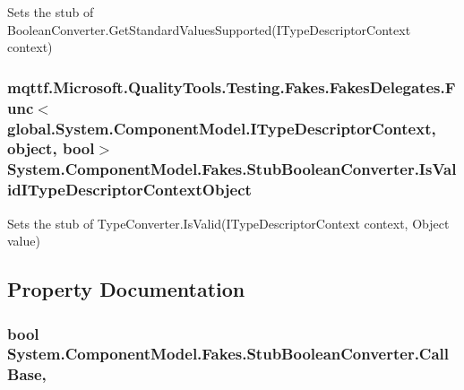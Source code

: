 Sets the stub of Boolean\-Converter.\-Get\-Standard\-Values\-Supported(\-I\-Type\-Descriptor\-Context context)

\hypertarget{class_system_1_1_component_model_1_1_fakes_1_1_stub_boolean_converter_abb8ccc319f6c9c06777e8aace8077986}{
\subsubsection[{Is\-Valid\-I\-Type\-Descriptor\-Context\-Object}]{\setlength{\rightskip}{0pt plus 5cm}mqttf.\-Microsoft.\-Quality\-Tools.\-Testing.\-Fakes.\-Fakes\-Delegates.\-Func$<$global.\-System.\-Component\-Model.\-I\-Type\-Descriptor\-Context, object, bool$>$ System.\-Component\-Model.\-Fakes.\-Stub\-Boolean\-Converter.\-Is\-Valid\-I\-Type\-Descriptor\-Context\-Object}}\label{class_system_1_1_component_model_1_1_fakes_1_1_stub_boolean_converter_abb8ccc319f6c9c06777e8aace8077986}


Sets the stub of Type\-Converter.\-Is\-Valid(\-I\-Type\-Descriptor\-Context context, Object value)



\subsection{Property Documentation}
\hypertarget{class_system_1_1_component_model_1_1_fakes_1_1_stub_boolean_converter_a40e24043ab02a1d6fbdba953f12c9279}{
\subsubsection[{Call\-Base}]{\setlength{\rightskip}{0pt plus 5cm}bool System.\-Component\-Model.\-Fakes.\-Stub\-Boolean\-Converter.\-Call\-Base\hspace{0.3cm}{\ttfamily [get]}, {\ttfamily [set]}}}\label{class_system_1_1_component_model_1_1_fakes_1_1_stub_boolean_converter_a40e24043ab02a1d6fbdba953f12c9279}


